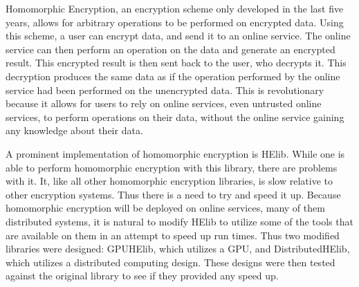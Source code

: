 Homomorphic Encryption, an encryption scheme only developed in the last five years, allows for arbitrary operations to be performed on encrypted data. Using this scheme, a user can encrypt data, and send it to an online service. The online service can then perform an operation on the data and generate an encrypted result. This encrypted result is then sent back to the user, who decrypts it. This decryption produces the same data as if the operation performed by the online service had been performed on the unencrypted data. This is revolutionary because it allows for users to rely on online services, even untrusted online services, to perform operations on their data, without the online service gaining any knowledge about their data.

A prominent implementation of homomorphic encryption is HElib. While one is able to perform homomorphic encryption with this library, there are problems with it. It, like all other homomorphic encryption libraries, is slow relative to other encryption systems. Thus there is a need to try and speed it up. Because homomorphic encryption will be deployed on online services, many of them distributed systems, it is natural to modify HElib to utilize some of the tools that are available on them in an attempt to speed up run times. Thus two modified libraries were designed: GPUHElib, which utilizes a GPU, and DistributedHElib, which utilizes a distributed computing design. These designs were then tested against the original library to see if they provided any speed up.